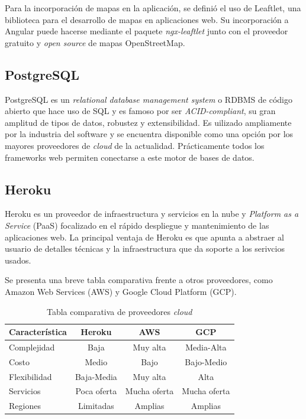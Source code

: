 Para la incorporación de mapas en la aplicación, se definió el uso de Leaftlet, una biblioteca para el desarrollo de mapas en aplicaciones web. Su incorporación a Angular puede hacerse mediante el paquete \textit{ngx-leaftlet}\citep{LEAFLET:1} junto con el proveedor gratuito y \textit{open source} de mapas OpenStreetMap.

\subsection{PostgreSQL}

PostgreSQL es un \textit{relational database management system} o RDBMS de código abierto que hace uso de SQL y es famoso por ser \textit{ACID-compliant}, su gran amplitud de tipos de datos, robustez y extensibilidad\citep{POSTGRES:1}. Es uilizado ampliamente por la industria del software\citep{POSTGRES:2} y se encuentra disponible como una opción por los mayores proveedores de \textit{cloud} de la actualidad. Prácticamente todos los frameworks web permiten conectarse a este motor de bases de datos. 

\subsection{Heroku}

Heroku es un proveedor de infraestructura y servicios en la nube y \textit{Platform as a Service} (PaaS) focalizado en el rápido despliegue y mantenimiento de las aplicaciones web. La principal ventaja de Heroku es que apunta a abstraer al usuario de detalles técnicas y la infraestructura que da soporte a los serivcios usados.

Se presenta una breve tabla comparativa frente a otros proveedores, como Amazon Web Services (AWS) y Google Cloud Platform (GCP).
\begin{table}[h]
	\centering
	\caption[Tabla comparativa]{Tabla comparativa de proveedores \textit{cloud}}
	\begin{tabular}{l c c c}    
		\toprule
		\textbf{Característica} 	 & \textbf{Heroku} & \textbf{AWS} & \textbf{GCP} \\
		\midrule
		Complejidad & Baja & Muy alta & Media-Alta \\		
		Costo & Medio & Bajo & Bajo-Medio			\\		
		Flexibilidad & Baja-Media & Muy alta & Alta \\
		Servicios & Poca oferta & Mucha oferta & Mucha oferta 	\\
		Regiones & Limitadas & Amplias & Amplias \\
		\bottomrule
		\hline
	\end{tabular}
	\label{tab:peces}
\end{table}

